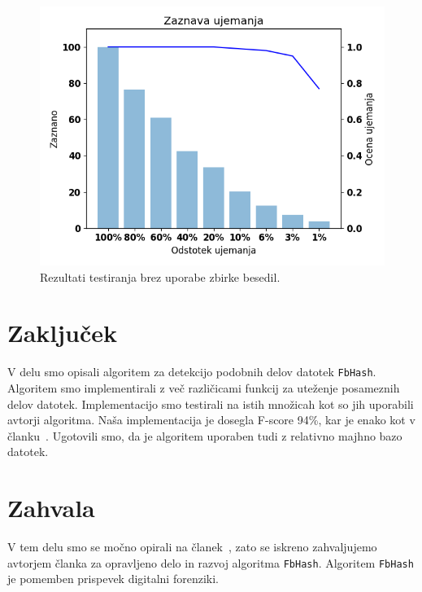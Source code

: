 \documentclass{acm_proc_article-sp}
\begin{document}
\begin{figure}[htb]
\begin{center}
\includegraphics[width=1\columnwidth]{brez_courpusa.png}
\end{center}
\caption{\small{Rezultati testiranja brez uporabe zbirke besedil.}}
\label{fig:brezZbirke}
\end{figure}

\FloatBarrier


\section{Zaklju\v{c}ek}
V delu smo opisali algoritem za detekcijo podobnih delov datotek \texttt{FbHash}. Algoritem smo implementirali z več različicami funkcij za uteženje posameznih delov datotek. Implementacijo smo testirali na istih množicah kot so jih uporabili avtorji algoritma. Naša implementacija je dosegla F-score 94\%, kar je enako kot v članku~\cite{fbhash}. Ugotovili smo, da je algoritem uporaben tudi z relativno majhno bazo datotek.
\\
\section{Zahvala}
V tem delu smo se močno opirali na članek~\cite{fbhash}, zato se iskreno zahvaljujemo avtorjem članka za opravljeno delo in razvoj algoritma \texttt{FbHash}. Algoritem \texttt{FbHash} je pomemben prispevek digitalni forenziki.




\balancecolumns
\end{document}
